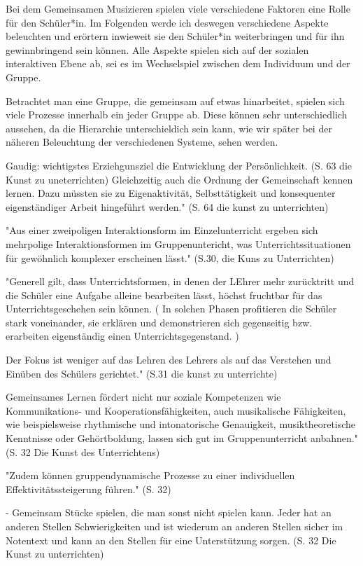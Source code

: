 







Bei dem Gemeinsamen Musizieren spielen viele verschiedene Faktoren eine Rolle
für den Schüler*in. Im Folgenden werde ich deswegen verschiedene Aspekte
beleuchten und erörtern inwieweit sie den Schüler*in weiterbringen und für ihn
gewinnbringend sein können.
Alle Aspekte spielen sich auf der sozialen interaktiven Ebene ab, sei es im
Wechselspiel zwischen dem Individuum und der Gruppe. 

Betrachtet man eine Gruppe, die gemeinsam auf etwas hinarbeitet, spielen sich
viele Prozesse innerhalb ein jeder Gruppe ab. Diese können sehr unterschiedlich
aussehen, da die Hierarchie unterschieldich sein kann, wie wir später bei der
näheren Beleuchtung der verschiedenen Systeme, sehen werden. 


Gaudig: wichtigstes Erziehgunsziel die Entwicklung der Persönlichkeit. (S. 63
die Kunst zu uneterrichten) Gleichzeitig auch die Ordnung der Gemeinschaft
kennen lernen. Dazu müssten sie zu Eigenaktivität, Selbsttätigkeit und konsequenter
eigenständiger Arbeit hingeführt werden." (S. 64 die kunst zu unterrichten)

"Aus einer zweipoligen Interaktionsform im Einzelunterricht ergeben sich
mehrpolige Interaktionsformen im Gruppenuntericht, was Unterrichtssituationen
für gewöhnlich komplexer erscheinen lässt." (S.30, die Kuns zu Unterrichten)


"Generell gilt, dass Unterrichtsformen, in denen der LEhrer mehr zurücktritt und
die Schüler eine Aufgabe alleine bearbeiten lässt, höchst fruchtbar für das
Unterrichtsgeschehen sein können. ( In solchen Phasen profitieren die Schüler
stark voneinander, sie erklären und demonstrieren sich gegenseitig bzw.
erarbeiten eigenständig einen Unterrichtsgegenstand. ) 

Der Fokus ist weniger auf
das Lehren des Lehrers als auf das Verstehen und Einüben des Schülers
gerichtet."  (S.31 die kunst zu unterrichte)


Gemeinsames Lernen fördert nicht nur soziale Kompetenzen wie Kommunikations- und
Kooperationsfähigkeiten, auch musikalische Fähigkeiten, wie beispielsweise
rhythmische und intonatorische Genauigkeit, musiktheoretische Kenntnisse oder
Gehörtboldung, lassen sich gut im Gruppenunterricht anbahnen." (S. 32 Die Kunst
des Unterrichtens)

"Zudem können gruppendynamische Prozesse zu einer individuellen
Effektivitätssteigerung führen." (S. 32)

- Gemeinsam Stücke spielen, die man sonst nicht spielen kann. Jeder hat an
anderen Stellen Schwierigkeiten und ist wiederum an anderen Stellen sicher im
Notentext und kann an den Stellen für eine Unterstützung sorgen. (S. 32 Die
Kunst zu unterrichten)

